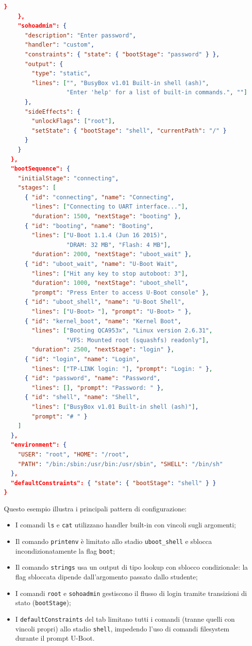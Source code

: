 \begin{lstlisting}[language=json]
      }
    },
    "sohoadmin": {
      "description": "Enter password",
      "handler": "custom",
      "constraints": { "state": { "bootStage": "password" } },
      "output": {
        "type": "static",
        "lines": ["", "BusyBox v1.01 Built-in shell (ash)",
                  "Enter 'help' for a list of built-in commands.", ""]
      },
      "sideEffects": {
        "unlockFlags": ["root"],
        "setState": { "bootStage": "shell", "currentPath": "/" }
      }
    }
  },
  "bootSequence": {
    "initialStage": "connecting",
    "stages": [
      { "id": "connecting", "name": "Connecting",
        "lines": ["Connecting to UART interface..."],
        "duration": 1500, "nextStage": "booting" },
      { "id": "booting", "name": "Booting",
        "lines": ["U-Boot 1.1.4 (Jun 16 2015)",
                  "DRAM: 32 MB", "Flash: 4 MB"],
        "duration": 2000, "nextStage": "uboot_wait" },
      { "id": "uboot_wait", "name": "U-Boot Wait",
        "lines": ["Hit any key to stop autoboot: 3"],
        "duration": 1000, "nextStage": "uboot_shell",
        "prompt": "Press Enter to access U-Boot console" },
      { "id": "uboot_shell", "name": "U-Boot Shell",
        "lines": ["U-Boot> "], "prompt": "U-Boot> " },
      { "id": "kernel_boot", "name": "Kernel Boot",
        "lines": ["Booting QCA953x", "Linux version 2.6.31",
                  "VFS: Mounted root (squashfs) readonly"],
        "duration": 2500, "nextStage": "login" },
      { "id": "login", "name": "Login",
        "lines": ["TP-LINK login: "], "prompt": "Login: " },
      { "id": "password", "name": "Password",
        "lines": [], "prompt": "Password: " },
      { "id": "shell", "name": "Shell",
        "lines": ["BusyBox v1.01 Built-in shell (ash)"],
        "prompt": "# " }
    ]
  },
  "environment": {
    "USER": "root", "HOME": "/root",
    "PATH": "/bin:/sbin:/usr/bin:/usr/sbin", "SHELL": "/bin/sh"
  },
  "defaultConstraints": { "state": { "bootStage": "shell" } }
}
\end{lstlisting}

Questo esempio illustra i principali pattern di configurazione:

\begin{itemize}
    \item I comandi \texttt{ls} e \texttt{cat} utilizzano handler built-in con vincoli sugli argomenti;
    \item Il comando \texttt{printenv} è limitato allo stadio \texttt{uboot\_shell} e sblocca incondizionatamente la flag \texttt{boot};
    \item Il comando \texttt{strings} usa un output di tipo lookup con sblocco condizionale: la flag sbloccata dipende dall'argomento passato dallo studente;
    \item I comandi \texttt{root} e \texttt{sohoadmin} gestiscono il flusso di login tramite transizioni di stato (\texttt{bootStage});
    \item I \texttt{defaultConstraints} del tab limitano tutti i comandi (tranne quelli con vincoli propri) allo stadio \texttt{shell}, impedendo l'uso di comandi filesystem durante il prompt U-Boot.
\end{itemize}
